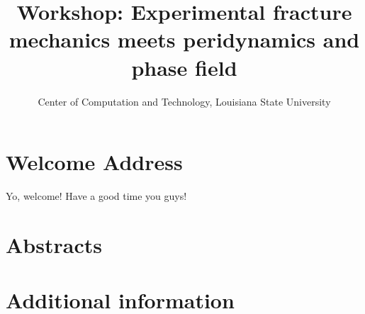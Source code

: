 \documentclass[12pt]{book}
\title{Workshop: Experimental fracture mechanics meets peridynamics and phase field}
\author{Center of Computation and Technology, Louisiana State University}
\newenvironment{conf-abstract}[4][]{
  \needspace{10\baselineskip}
  \begin{center}
    { \renewcommand\textsuperscript[1]{}
      \phantomsection\addcontentsline{toc}{section}
      {\texorpdfstring{#2 (\emph{#3})}{#2 (#3)}}
    }
    {{\large\bfseries #2}\marginnote{#1}\par}
    \medskip
    {#3\par}
    \smallskip
    {\small #4\par}
  \end{center}
}{%
  \bigskip
  \hrule
  \bigskip
}
\newcommand{\indexauthors}[1]{%
  \forcsvlist{\index}{#1}
}
\begin{document}
\frontmatter

\maketitle



\chapter{Welcome Address}

Yo, welcome! Have a good time you guys!


\begin{sidewaysfigure}

\end{sidewaysfigure}


\tableofcontents

\mainmatter
\chapter{Abstracts}




{
\begin{conf-abstract}[\datum\\\time]
{\title}
{\first \last}
{\affiliation}
\indexauthors{\last!\first}
\end{conf-abstract}
}




%

%
%
%

\chapter{Additional information}
\end{document}
